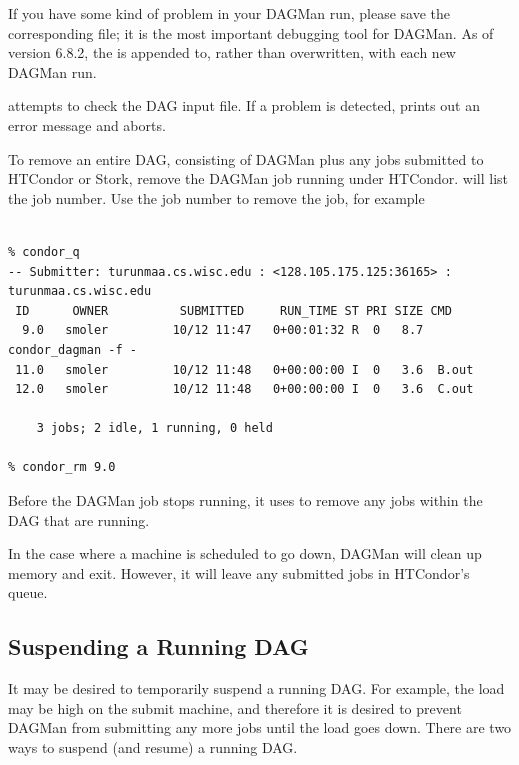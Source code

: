 If you have some kind of problem in your DAGMan run, please save
the corresponding  file; it is the most important
debugging tool for DAGMan.  As of version 6.8.2, the 
is appended to, rather than overwritten, with each new DAGMan run.


 attempts to check the DAG input file.
If a problem is detected,
 prints out an error message and aborts.

To remove an entire DAG, consisting of DAGMan plus
any jobs submitted to HTCondor or Stork,
remove the DAGMan job running under HTCondor.
 will list the job number.
Use the job number to remove the job, for example

\footnotesize
\begin{verbatim}

% condor_q
-- Submitter: turunmaa.cs.wisc.edu : <128.105.175.125:36165> : turunmaa.cs.wisc.edu
 ID      OWNER          SUBMITTED     RUN_TIME ST PRI SIZE CMD
  9.0   smoler         10/12 11:47   0+00:01:32 R  0   8.7  condor_dagman -f -
 11.0   smoler         10/12 11:48   0+00:00:00 I  0   3.6  B.out
 12.0   smoler         10/12 11:48   0+00:00:00 I  0   3.6  C.out

    3 jobs; 2 idle, 1 running, 0 held

% condor_rm 9.0
\end{verbatim}
\normalsize

Before the DAGMan job stops running, it uses 
to remove any jobs within the DAG that are running.

In the case where a
machine is scheduled to go down,
DAGMan will clean up memory and exit.
However, it will leave any submitted jobs
in HTCondor's queue.

\subsection{\label{sec:DagSuspend}Suspending a Running DAG}

It may be desired to temporarily suspend a running DAG.
For example, the load may be high on the submit machine,
and therefore it is desired to prevent DAGMan from
submitting any more jobs until the load goes down.
There are two ways to suspend (and resume) a running DAG.

